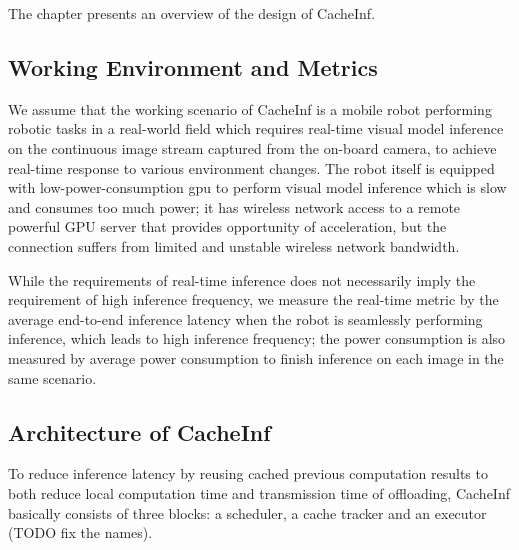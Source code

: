 The chapter presents an overview of the design of CacheInf.

\subsection*{Working Environment and Metrics}
We assume that the working scenario of CacheInf is a mobile robot performing robotic tasks in a real-world field which requires real-time visual model inference on the continuous image stream captured from the on-board camera, to achieve real-time response to various environment changes.
The robot itself is equipped with low-power-consumption gpu to perform visual model inference which is slow and consumes too much power; it has wireless network access to a remote powerful GPU server that provides opportunity of acceleration, but the connection suffers from limited and unstable wireless network bandwidth.

While the requirements of real-time inference does not necessarily imply the requirement of high inference frequency, we measure the real-time metric by the average end-to-end inference latency when the robot is seamlessly performing inference, which leads to high inference frequency; the power consumption is also measured by average power consumption to finish inference on each image in the same scenario.

\subsection{Architecture of CacheInf}
To reduce inference latency by reusing cached previous computation results to both reduce local computation time and transmission time of offloading, CacheInf basically consists of three blocks: a scheduler, a cache tracker and an executor (TODO fix the names).

